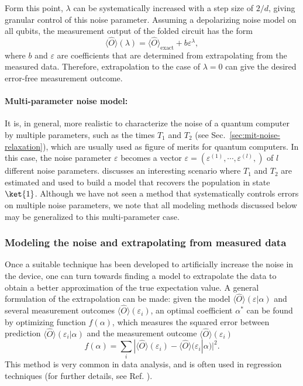 Form this point, $\lambda$ can be systematically increased with a step size of $2/d$, giving granular control of this noise parameter. Assuming a depolarizing noise model on all qubits, the measurement output of the folded circuit has the form
\begin{equation}
    \langle \hat{O} \rangle(\lambda) = \langle \hat{O} \rangle_{\mathrm{exact}} + b \varepsilon^\lambda,
\end{equation}
where $b$ and $\varepsilon$ are coefficients that are determined from extrapolating from the measured data. Therefore, extrapolation to the case of $\lambda=0$ can give the desired error-free measurement outcome.

\paragraph{Multi-parameter noise model:}
It is, in general, more realistic to characterize the noise of a quantum computer by multiple parameters, such as the  times $T_1$ and $T_2$ (see Sec.~\ref{sec:mit-noise-relaxation}), which are usually used as figure of merits for quantum computers. In this case, the noise parameter $\varepsilon$ becomes a vector
$\varepsilon = (\varepsilon^{(1)},\cdots, \varepsilon^{(l)},)$ of $l$ different noise parameters.
\citet{ottenRecoveringNoisefreeQuantum2019} discusses an interesting scenario where $T_1$ and $T_2$ are
estimated and used to build a model that recovers the population in state $\ket{1}$.
Although we have not seen a method that systematically controls errors on multiple noise parameters,
we note that all modeling methods discussed below may be generalized to this multi-parameter case.

\subsubsection{Modeling the noise and extrapolating from measured data} \label{sec:mit-noise_model}

Once a suitable technique has been developed to artificially increase the noise in the device, one can turn towards finding a model to extrapolate the data to obtain a better approximation of the true expectation value.  A general formulation of the extrapolation can be made: given the model $\langle \hat{O} \rangle(\varepsilon|\alpha)$ and several measurement outcomes $\langle \hat{O} \rangle(\varepsilon_i)$, an optimal coefficient $\alpha^*$ can be found by optimizing function $f(\alpha)$, which measures the squared error between prediction $\langle \hat{O} \rangle(\varepsilon_i|\alpha)$ and the measurement outcome $\langle \hat{O} \rangle(\varepsilon_i)$
\begin{equation}
    \label{eq:mit-model-square-loss}
    f(\alpha) = \sum_i |\langle \hat{O} \rangle(\varepsilon_i) - \langle \hat{O} \rangle(\varepsilon_i|\alpha)|^2.
\end{equation}
This method is very common in data analysis, and is often used in regression techniques (for further details, see Ref. \cite{goodfellowDeepLearning2016}). 

